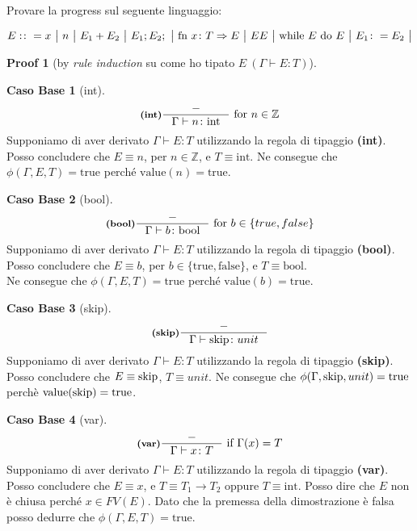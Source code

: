 \documentclass[a4paper, 10pt]{article}
\newcommand{\numberset}{\mathbb}
\newcommand{\Z}{\numberset{Z}}
\newcommand{\integer}{\textup{int}}
\newcommand{\bool}{\textup{bool}}
\newcommand{\skipp}{\textup{skip}}
\theoremstyle{definition}
\newtheorem{prf}{Proof}[]
\newtheorem{base}{Caso Base}
\newcommand{\infer}[4]{\inference[\textbf{#1}]{#2}{#3}#4 }
\begin{document}
\begin{multicols}{2}
Provare la progress sul seguente linguaggio:

\[
	E:\colon = x \ \big|\ n \ \big|\ E_1 + E_2 \ \big|\ E_1;E_2; \ \big|\ \textup{fn}\ x\colon T \Rightarrow E \ \big|\ EE\ 
	\big|\ \textup{while}\ E\ \textup{do}\ E\ \big|\ E_1\colon = E_2 \ \big|
\]


\begin{prf}[by \textit{rule induction} su come ho tipato $ E\ (\Gamma \vdash E\colon T) $]
	\begin{base}[int]
		\[
			\infer{(int)}{-}{\Gamma \vdash n\colon \integer}{\ \textup{for}\ n \in \Z}
		\]
		Supponiamo di aver derivato $ \Gamma \vdash E\colon T $ utilizzando la regola di tipaggio \textbf{(int)}. Posso concludere che $ E\equiv n $, per $ n \in \Z $, e $ T\equiv \text{int} $. Ne consegue che $ \phi (\Gamma, E, T) = \text{true} $ perché $ \text{value}(n) = \text{true} $.
	\end{base}
	\begin{base}[bool]
		\[
		\infer{(bool)}{-}{\Gamma \vdash b\colon \bool}{\ \textup{for}\ b \in \{true, false\}}
		\]
		Supponiamo di aver derivato $ \Gamma \vdash E\colon T $ utilizzando la regola di tipaggio \textbf{(bool)}.\\ 
		Posso concludere che $ E\equiv b $, per $ b \in \{\text{true}, \text{false}\} $, e $ T\equiv \text{bool} $.\\ 
		Ne consegue che $ \phi (\Gamma, E, T) = \text{true} $ perché $ \text{value}(b) = \text{true} $.
	\end{base}
	\begin{base}[skip]
		\[
			\infer{(skip)}{-}{\Gamma\vdash \skipp\colon unit}{}
		\]
		Supponiamo di aver derivato $ \Gamma \vdash E\colon T $ utilizzando la regola di tipaggio \textbf{(skip)}. Posso concludere che $ E\equiv \skipp $, $ T\equiv unit $. Ne consegue che $ \phi (\Gamma, \skipp, unit) = \textup{true} $ perchè $ \text{value}(\skipp) = \text{true} $.
	\end{base}
	\begin{base}[var]
		\[
			\infer{(var)}{-}{\Gamma \vdash x \colon T}{\ \textup{if}\ \Gamma (x) = T} 
		\]
		Supponiamo di aver derivato $ \Gamma \vdash E\colon T $ utilizzando la regola di tipaggio \textbf{(var)}. Posso concludere che $ E\equiv x $, e $ T\equiv T_1\rightarrow T_2$ oppure $ T\equiv \text{int} $. Posso dire che $ E $ non è chiusa perché $ x \in FV(E) $. Dato che la premessa della dimostrazione è falsa posso dedurre che $ \phi (\Gamma, E, T) = \text{true} $.
	\end{base}

\end{prf}
\end{multicols}
\end{document}
